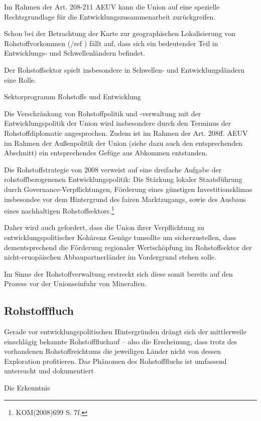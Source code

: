 \documentclass[12pt,a4paper,oneside]{book} %
\begin{document}
Im Rahmen der Art. 208-211 AEUV kann die Union auf eine spezielle Rechtsgrundlage für die Entwicklungszusammenarbeit zurückgreifen.

Schon bei der Betrachtung der Karte zur geographischen Lokalisierung von Rohstoffvorkommen (/ref ) fällt auf, dass sich ein bedeutender Teil in Entwicklungs- und Schwellenländern befindet.

Der Rohstoffsektor spielt insbesondere in Schwellen- und Entwicklungsländern eine Rolle.

Sektorprogramm Rohstoffe und Entwicklung

Die Verschränkung von Rohstoffpolitik und -verwaltung mit der Entwicklungspolitik der Union wird insbesondere durch den Terminus der Rohstoffdiplomatie angesprochen. Zudem ist im Rahmen der Art. 208ff. AEUV im Rahmen der Außenpolitik der Union (siehe dazu auch den entsprechenden Abschnitt) ein entsprechendes Gefüge aus Abkommen entstanden.

Die Rohstoffstrategie von 2008 verweist auf eine dreifache Aufgabe der rohstoffbezogenenen Entwicklungspolitik: Die Stärkung lokaler Staatsführung durch Governance-Verpflichtungen, Förderung eines günstigen Investitionsklimas insbesondee vor dem Hintergrund des fairen Marktzugangs, sowie des Ausbaus eines nachhaltigen Rohstoffsektors.\footnote{KOM(2008)699 S. 7f.}

Daher wird auch gefordert, dass die Union \glqq ihrer Verpflichtung zu entwicklungspolitischer Kohärenz Genüge tun\grqq sollte um sicherzustellen, dass dementsprechend die Förderung regionaler Wertschöpfung im Rohstoffsektor der nicht-eruopäischen Abbaupartnerländer im Vordergrund stehen solle.\autocite[15]{Kueblboeck_2023}

Im Sinne der Rohstoffverwaltung erstreckt sich diese somit bereits auf den Prozess vor der Unionseinfuhr von Mineralien.

\subsection{Rohstofffluch}

Gerade vor entwicklungspolitischen Hintergründen drängt sich der mittlerweile einschlägig bekannte \glqq Rohstofffluch\grqq auf -- also die Erscheinung, dass trotz des vorhandenen Rohstoffreichtums die jeweiligen Länder nicht von dessen Exploration profitieren. Das Phänomen des Rohstofffluchs ist umfassend untersucht und dokumentiert

Die Erkenntnis
\end{document}
